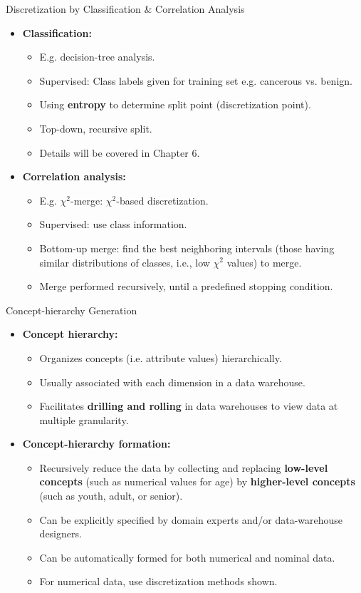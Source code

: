 \begin{frame}{Discretization by Classification \& Correlation Analysis}
	\begin{itemize}
		\item \textbf{Classification:}
		\begin{itemize}
			\item E.g. decision-tree analysis.
			\item Supervised: Class labels given for training set e.g. 
			cancerous vs. benign.
			\item Using \textbf{entropy} to determine split point 
			(discretization point).
			\item Top-down, recursive split.
			\item Details will be covered in Chapter 6.
		\end{itemize}
		\item \textbf{Correlation analysis:}
		\begin{itemize}
			\item E.g. $\chi^2$-merge: $\chi^2$-based discretization.
			\item Supervised: use class information.
			\item Bottom-up merge: find the best neighboring intervals (those 
			having similar distributions of classes, i.e., low $\chi^2$ values) 
			to merge.
			\item Merge performed recursively, until a predefined stopping 
			condition.
		\end{itemize}
	\end{itemize}
\end{frame}

\begin{frame}{Concept-hierarchy Generation}
	\begin{itemize}
		\item \textbf{Concept hierarchy:}
		\begin{itemize}
			\item Organizes concepts (i.e. attribute values) hierarchically.
			\item Usually associated with each dimension in a data warehouse.
			\item Facilitates \textbf{drilling and rolling} in data warehouses 
			to view data at multiple granularity.
		\end{itemize}
		\item \textbf{Concept-hierarchy formation:}
		\begin{itemize}
			\item Recursively reduce the data by collecting and replacing 
			\textbf{low-level concepts} (such as numerical values for age) by 
			\textbf{higher-level concepts} (such as youth, adult, or senior).
			\item Can be explicitly specified by domain experts and/or 
			data-warehouse designers.
			\item Can be automatically formed for both numerical and nominal 
			data.
			\item For numerical data, use discretization methods shown.
		\end{itemize}
	\end{itemize}
\end{frame}

